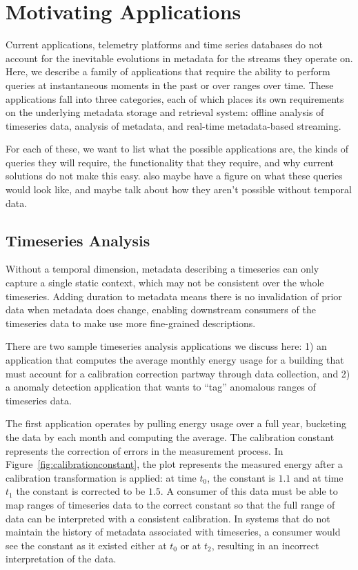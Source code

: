 \section{Motivating Applications} \label{section:motivation}

Current applications, telemetry platforms and time series databases do not
account for the inevitable evolutions in metadata for the streams they operate
on. Here, we describe a family of applications that require the ability to
perform queries at instantaneous moments in the past or over ranges over time.
These applications fall into three categories, each of which places its
own requirements on the underlying metadata storage and retrieval system:
offline analysis of timeseries data, analysis of metadata, and real-time
metadata-based streaming.

For each of these, we want to list what the possible applications are,
the kinds of queries they will require, the functionality that they require,
and why current solutions do not make this easy. also maybe have a figure
on what these queries would look like, and maybe talk about how they aren't possible
without temporal data.
\fi

\subsection{Timeseries Analysis} \label{subsection:timeseriesanalysis}

Without a temporal dimension, metadata describing a timeseries can only
capture a single static context, which may not be consistent over the
whole timeseries. Adding duration to metadata means there is no invalidation
of prior data when metadata does change, enabling downstream consumers
of the timeseries data to make use more fine-grained descriptions.

There are two sample timeseries analysis applications we discuss here: 1) an
application that computes the average monthly energy usage for a building that
must account for a calibration correction partway through data collection, and
2) a anomaly detection application that wants to ``tag'' anomalous ranges of
timeseries data.

The first application operates by pulling energy usage over a full year,
bucketing the data by each month and computing the average. The calibration
constant represents the correction of errors in the measurement process. In Figure~\ref{fig:calibrationconstant},
the plot represents the measured energy after a calibration transformation is applied: at time $t_0$, the constant
is $1.1$ and at time $t_1$ the constant is corrected to be $1.5$. 
A consumer of this data must be able to map ranges of timeseries data to the correct
constant so that the full range of data can be interpreted with a consistent calibration. In systems that do not maintain the history of metadata associated with timeseries, a consumer would
see the constant as it existed either at $t_0$ or at $t_2$, resulting in an incorrect interpretation of the data.

